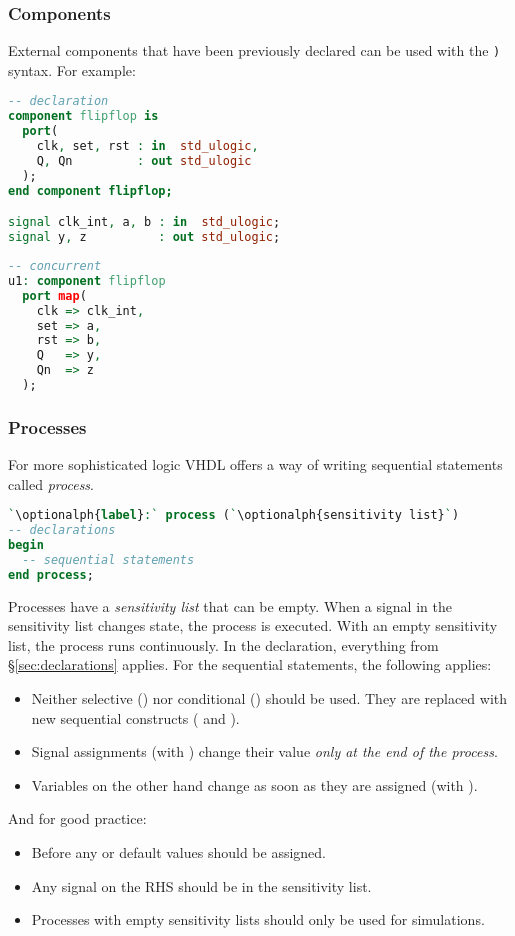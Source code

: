 \subsubsection{Components}
External components that have been previously declared can be used with the
\texttt{)} syntax. For example:
\begin{lstlisting}[language=vhdl]
-- declaration
component flipflop is
  port(
    clk, set, rst : in  std_ulogic,
    Q, Qn         : out std_ulogic 
  );
end component flipflop;

signal clk_int, a, b : in  std_ulogic;
signal y, z          : out std_ulogic;
\end{lstlisting}
\begin{lstlisting}[language=vhdl]
-- concurrent
u1: component flipflop
  port map(
    clk => clk_int,
    set => a,
    rst => b,
    Q   => y,
    Qn  => z
  );

\end{lstlisting}

\subsubsection{Processes}
For more sophisticated logic VHDL offers a way of writing sequential statements
called \emph{process}.
\begin{lstlisting}[language=vhdl]
`\optionalph{label}:` process (`\optionalph{sensitivity list}`)
-- declarations
begin
  -- sequential statements
end process;
\end{lstlisting}
Processes have a \emph{sensitivity list} that can be empty.  When a signal in
the sensitivity list changes state, the process is executed.  With an empty
sensitivity list, the process runs continuously.  In the declaration,
everything from \S\ref{sec:declarations} applies. For the sequential
statements, the following applies:
\begin{itemize}
  \item Neither selective () nor conditional () should be used.
    They are replaced with new sequential constructs ( and ).
  \item Signal assignments (with \vhdl{<=}) change their value
    \emph{only at the end of the process}.
  \item Variables on the other hand change as soon as they are assigned (with \vhdl{:=}).
\end{itemize}
And for good practice:
\begin{itemize}
  \item Before any  or  default values should be assigned.
  \item Any signal on the RHS should be in the sensitivity list.
  \item Processes with empty sensitivity lists should only be used for simulations.
\end{itemize}

